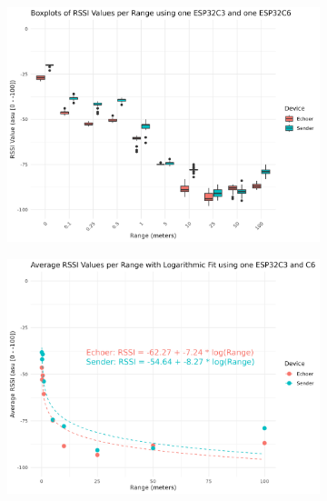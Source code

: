 \begin{figure}[H]
    \centering
    \begin{subfigure}{0.45\textwidth}
        \includegraphics[width=\linewidth]{rstudio/analysis/plots/ESP32C36_rssi_box.png}
    \end{subfigure}
    \begin{subfigure}{0.45\textwidth}
        \includegraphics[width=\linewidth]{rstudio/analysis/plots/ESP32C36_avg_rssi.png}
    \end{subfigure}


\end{figure}
